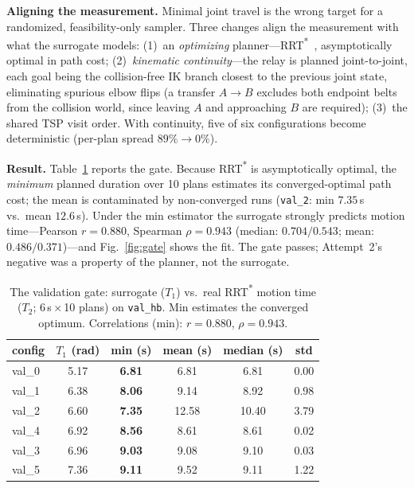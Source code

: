 \documentclass[conference]{IEEEtran}
\begin{document}
\textbf{Aligning the measurement.} Minimal joint travel is the wrong target for a randomized,
feasibility-only sampler. Three changes align the measurement with what the surrogate models:
(1)~an \emph{optimizing} planner---RRT\textsuperscript{*}~\cite{rrtstar}, asymptotically optimal
in path cost; (2)~\emph{kinematic continuity}---the relay is planned joint-to-joint, each goal
being the collision-free IK branch closest to the previous joint state, eliminating spurious
elbow flips (a transfer $A\!\rightarrow\!B$ excludes both endpoint belts from the collision
world, since leaving $A$ and approaching $B$ are required); (3)~the shared TSP visit order. With
continuity, five of six configurations become deterministic (per-plan spread
$89\%\!\rightarrow\!0\%$).

\textbf{Result.} Table~\ref{tab:gate} reports the gate. Because RRT\textsuperscript{*} is
asymptotically optimal, the \emph{minimum} planned duration over 10 plans estimates its
converged-optimal path cost; the mean is contaminated by non-converged runs (\texttt{val\_2}:
min $7.35$\,s vs.\ mean $12.6$\,s). Under the min estimator the surrogate strongly predicts
motion time---Pearson $r=0.880$, Spearman $\rho=0.943$ (median: $0.704/0.543$; mean:
$0.486/0.371$)---and Fig.~\ref{fig:gate} shows the fit. The gate passes; Attempt~2's negative
was a property of the planner, not the surrogate.

\begin{table}[t]
\caption{The validation gate: surrogate ($T_1$) vs.\ real RRT\textsuperscript{*} motion time
($T_2$; $6$\,s\,$\times$\,10 plans) on \texttt{val\_hb}. Min estimates the converged optimum.
Correlations (min): $r=0.880$, $\rho=0.943$.}
\label{tab:gate}
\centering
\begin{tabular}{lccccc}
\toprule
config & $T_1$ (rad) & min (s) & mean (s) & median (s) & std \\
\midrule
val\_0 & 5.17 & \textbf{6.81} & 6.81 & 6.81 & 0.00 \\
val\_1 & 6.38 & \textbf{8.06} & 9.14 & 8.92 & 0.98 \\
val\_2 & 6.60 & \textbf{7.35} & 12.58 & 10.40 & 3.79 \\
val\_4 & 6.92 & \textbf{8.56} & 8.61 & 8.61 & 0.02 \\
val\_3 & 6.96 & \textbf{9.03} & 9.08 & 9.10 & 0.03 \\
val\_5 & 7.36 & \textbf{9.11} & 9.52 & 9.11 & 1.22 \\
\bottomrule
\end{tabular}
\end{table}
\end{document}
